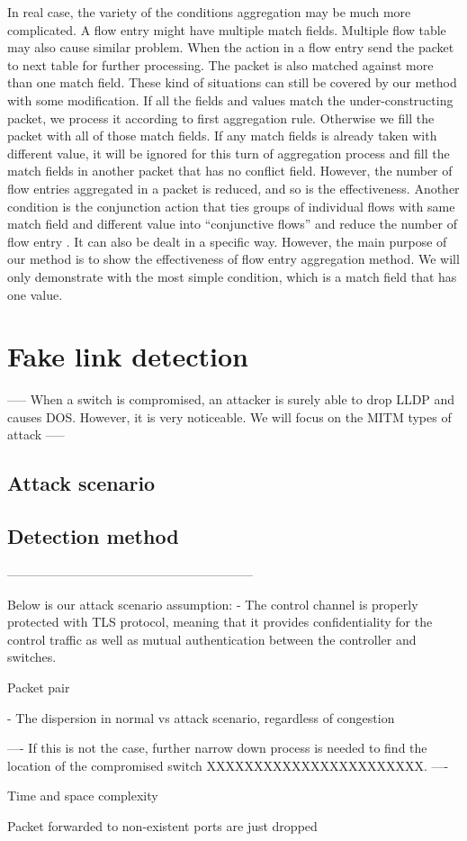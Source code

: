 In real case, the variety of the conditions aggregation may be much more complicated. A flow entry might have multiple match fields. Multiple flow table may also cause similar problem. When the action in a flow entry send the packet to next table for further processing. The packet is also matched against more than one match field. These kind of situations can still be covered by our method with some modification. 
If all the fields and values match the under-constructing packet, we process it according to first aggregation rule. Otherwise we fill the packet with all of those match fields. If any match fields is already taken with different value, it will be ignored for this turn of aggregation process and fill the match fields in another packet that has no conflict field. However, the number of flow entries aggregated in a packet is reduced, and so is the effectiveness. Another condition is the conjunction action that ties groups of individual flows with same match field and different value into ``conjunctive  flows'' and reduce the number of flow entry \cite{OVS_OFCTL}. It can also be dealt in a specific way. However, the main purpose of our method is to show the effectiveness of flow entry aggregation method. We will only demonstrate with the most simple condition, which is a match field that has one value.

\section{Fake link detection}

-----
When a switch is compromised, an attacker is surely able to drop LLDP and causes DOS. However, it is very noticeable. We will focus on the MITM types of attack
-----
\subsection{Attack scenario}
\subsection{Detection method}


-----------------------------------------------------------

Below is our attack scenario assumption: 
- The control channel is properly protected with TLS protocol, meaning
that it provides confidentiality for the control traffic as well as mutual
authentication between the controller and switches.

Packet pair

- The dispersion in normal vs attack scenario, regardless of congestion

----
If this is not the case, further narrow down process is needed to find the location of the compromised switch XXXXXXXXXXXXXXXXXXXXXXX.
----

Time and space complexity


Packet forwarded to non-existent ports are just dropped
